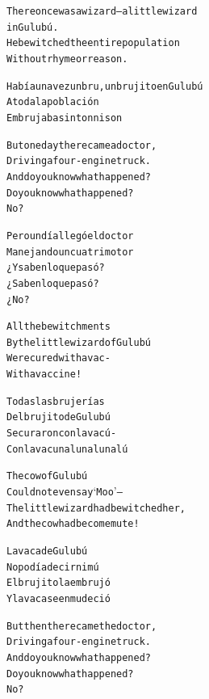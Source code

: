 \documentclass[11pt,a4paper]{article}
\begin{document}
\begin{parcolumns}{2}

\colchunk
{
\begin{alltt}\normalfont
There once was a wizard – a little wizard
in Gulubú.
He bewitched the entire population
Without rhyme or reason.
\end{alltt}
}

\colchunk
{
\begin{alltt}\normalfont
Había una vez un bru, un brujito en Gulubú
A toda la población
Embrujaba sin ton ni son
\end{alltt}
}

\colplacechunks

\colchunk
{
\begin{alltt}\normalfont
But one day there came a doctor,
Driving a four-engine truck.
And do you know what happened?
Do you know what happened?
No?
\end{alltt}
}

\colchunk
{
\begin{alltt}\normalfont
Pero un día llegó el doctor
Manejando un cuatrimotor
¿Y saben lo que pasó?
¿Saben lo que pasó?
¿No?
\end{alltt}
}

\colplacechunks

\colchunk
{
\begin{alltt}\normalfont
All the bewitchments
By the little wizard of Gulubú
Were cured with a vac-
With a vaccine!
\end{alltt}
}

\colchunk
{
\begin{alltt}\normalfont
Todas las brujerías
Del brujito de Gulubú
Se curaron con la vacú-
Con la vacuna luna luna lú
\end{alltt}
}

\colplacechunks

\colchunk
{
\begin{alltt}\normalfont
The cow of Gulubú
Could not even say ‘Moo’ –
The little wizard had bewitched her,
And the cow had become mute!
\end{alltt}
}

\colchunk
{
\begin{alltt}\normalfont
La vaca de Gulubú
No podía decir ni mú
El brujito la embrujó
Y la vaca se enmudeció
\end{alltt}
}

\colplacechunks

\colchunk
{
\begin{alltt}\normalfont
But then there came the doctor,
Driving a four-engine truck.
And do you know what happened?
Do you know what happened?
No?
\end{alltt}
}


\end{parcolumns}
\end{document}
